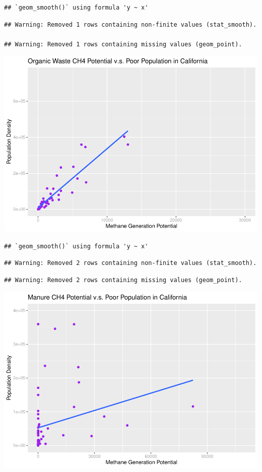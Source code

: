 \documentclass[
  12pt,
]{article}
\begin{document}
\begin{verbatim}
## `geom_smooth()` using formula 'y ~ x'
\end{verbatim}

\begin{verbatim}
## Warning: Removed 1 rows containing non-finite values (stat_smooth).

## Warning: Removed 1 rows containing missing values (geom_point).
\end{verbatim}

\includegraphics{FDR_ProjectReport_files/figure-latex/unnamed-chunk-7-4.pdf}

\begin{verbatim}
## `geom_smooth()` using formula 'y ~ x'
\end{verbatim}

\begin{verbatim}
## Warning: Removed 2 rows containing non-finite values (stat_smooth).
\end{verbatim}

\begin{verbatim}
## Warning: Removed 2 rows containing missing values (geom_point).
\end{verbatim}

\includegraphics{FDR_ProjectReport_files/figure-latex/unnamed-chunk-7-5.pdf}
\end{document}
